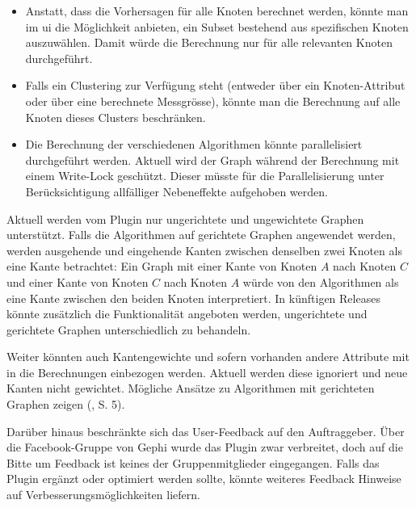 \begin{itemize}
    \item Anstatt, dass die Vorhersagen für alle Knoten berechnet werden, könnte man im \acs{ui} die Möglichkeit anbieten, ein Subset bestehend aus spezifischen Knoten auszuwählen. Damit würde die Berechnung nur für alle relevanten Knoten durchgeführt.
    \item Falls ein Clustering zur Verfügung steht (entweder über ein Knoten-Attribut oder über eine berechnete Messgrösse), könnte man die Berechnung auf alle Knoten dieses Clusters beschränken.
    \item Die Berechnung der verschiedenen Algorithmen könnte parallelisiert durchgeführt werden. Aktuell wird der Graph während der Berechnung mit einem Write-Lock geschützt. Dieser müsste für die Parallelisierung unter Berücksichtigung allfälliger Nebeneffekte aufgehoben werden.
\end{itemize}

Aktuell werden vom Plugin nur ungerichtete und ungewichtete Graphen unterstützt.
Falls die Algorithmen auf gerichtete Graphen angewendet werden, werden ausgehende und eingehende Kanten zwischen denselben zwei Knoten als eine Kante betrachtet:
Ein Graph mit einer Kante von Knoten $A$ nach Knoten $C$ und einer Kante von Knoten $C$ nach Knoten $A$ würde von den Algorithmen als eine Kante zwischen den beiden Knoten interpretiert.
In künftigen Releases könnte zusätzlich die Funktionalität angeboten werden, ungerichtete und gerichtete Graphen unterschiedlich zu behandeln.

Weiter könnten auch Kantengewichte und sofern vorhanden andere Attribute mit in die Berechnungen einbezogen werden.
Aktuell werden diese ignoriert und neue Kanten nicht gewichtet. Mögliche Ansätze zu Algorithmen mit gerichteten Graphen zeigen \citeauthor{garcia-gasulla_pdf_2014} (\citeyear{garcia-gasulla_pdf_2014}, S. 5).

Darüber hinaus beschränkte sich das User-Feedback auf den Auftraggeber.
Über die Facebook-Gruppe von Gephi wurde das Plugin zwar verbreitet, doch auf die Bitte um Feedback ist keines der Gruppenmitglieder eingegangen.
Falls das Plugin ergänzt oder optimiert werden sollte, könnte weiteres Feedback Hinweise auf Verbesserungsmöglichkeiten liefern.
